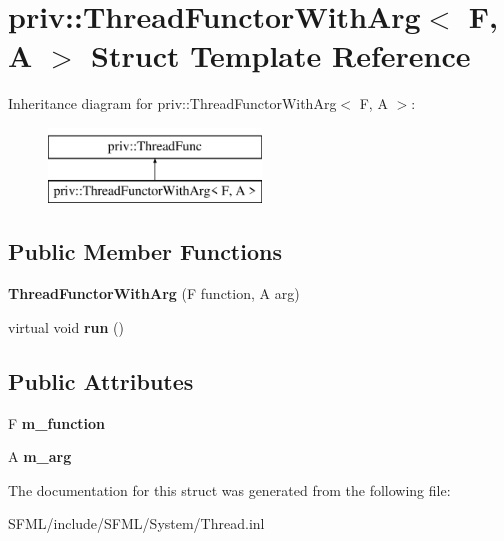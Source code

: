 \hypertarget{structpriv_1_1_thread_functor_with_arg}{}\section{priv\+:\+:Thread\+Functor\+With\+Arg$<$ F, A $>$ Struct Template Reference}
\label{structpriv_1_1_thread_functor_with_arg}
Inheritance diagram for priv\+:\+:Thread\+Functor\+With\+Arg$<$ F, A $>$\+:\begin{figure}[H]
\begin{center}
\leavevmode
\includegraphics[height=2.000000cm]{structpriv_1_1_thread_functor_with_arg}
\end{center}
\end{figure}
\subsection*{Public Member Functions}
\begin{DoxyCompactItemize}
\item 
\mbox{\label{structpriv_1_1_thread_functor_with_arg_ae3745753b77880cdfda6f10d72748efa}} 
{\bfseries Thread\+Functor\+With\+Arg} (F function, A arg)
\item 
\mbox{\label{structpriv_1_1_thread_functor_with_arg_a0f8bb6ba36819e80016528bab8b0bd4f}} 
virtual void {\bfseries run} ()
\end{DoxyCompactItemize}
\subsection*{Public Attributes}
\begin{DoxyCompactItemize}
\item 
\mbox{\label{structpriv_1_1_thread_functor_with_arg_ab12992af3112f15df4b6f0dbce3137b9}} 
F {\bfseries m\+\_\+function}
\item 
\mbox{\label{structpriv_1_1_thread_functor_with_arg_ac598f7701f976320bc3964733b9ae9ae}} 
A {\bfseries m\+\_\+arg}
\end{DoxyCompactItemize}


The documentation for this struct was generated from the following file\+:\begin{DoxyCompactItemize}
\item 
S\+F\+M\+L/include/\+S\+F\+M\+L/\+System/Thread.\+inl\end{DoxyCompactItemize}
